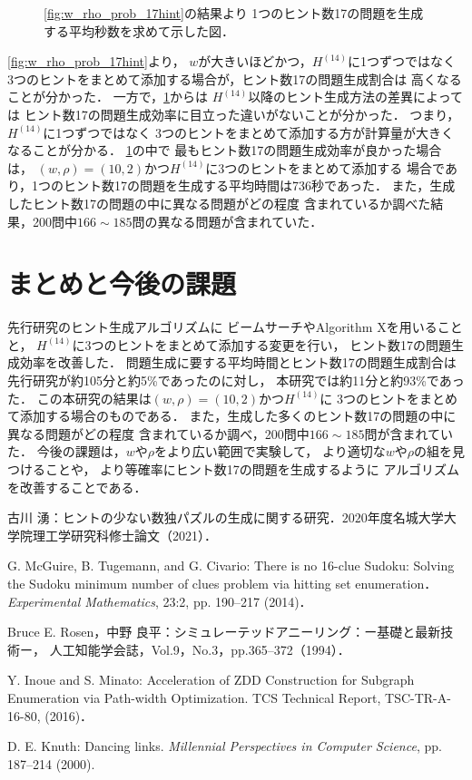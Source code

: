 \documentclass[a4paper, 9pt]{jarticle}
\begin{document}
\begin{論文概要}
\begin{figure}[bt]
  \caption{\figurename{\ref{fig:w_rho_prob_17hint}}の結果より
  1つのヒント数17の問題を生成する平均秒数を求めて示した図．} 
  \label{fig:w_rho_efficiency_17hint}
\end{figure}
\figurename{\ref{fig:w_rho_prob_17hint}}より，
$w$が大きいほどかつ，$H^{(14)}$に1つずつではなく
3つのヒントをまとめて添加する場合が，ヒント数17の問題生成割合は
高くなることが分かった．
一方で，\figurename{\ref{fig:w_rho_efficiency_17hint}}からは
$H^{(14)}$以降のヒント生成方法の差異によっては
ヒント数17の問題生成効率に目立った違いがないことが分かった．
つまり，$H^{(14)}$に1つずつではなく
3つのヒントをまとめて添加する方が計算量が大きくなることが分かる．
\figurename{\ref{fig:w_rho_efficiency_17hint}}の中で
最もヒント数17の問題生成効率が良かった場合は，
$(w, \rho) = (10, 2)$かつ$H^{(14)}$に3つのヒントをまとめて添加する
場合であり，1つのヒント数17の問題を生成する平均時間は736秒であった．
また，生成したヒント数17の問題の中に異なる問題がどの程度
含まれているか調べた結果，200問中$166 \sim 185$問の異なる問題が含まれていた．

\section{まとめと今後の課題}
先行研究のヒント生成アルゴリズムに
ビームサーチやAlgorithm Xを用いることと，
$H^{(14)}$に3つのヒントをまとめて添加する変更を行い，
ヒント数17の問題生成効率を改善した．
問題生成に要する平均時間とヒント数17の問題生成割合は
先行研究が約105分と約5\%であったのに対し，
本研究では約11分と約93\%であった．
この本研究の結果は$(w, \rho) = (10, 2)$かつ$H^{(14)}$に
3つのヒントをまとめて添加する場合のものである．
また，生成した多くのヒント数17の問題の中に異なる問題がどの程度
含まれているか調べ，200問中$166 \sim 185$問が含まれていた．
今後の課題は，$w$や$\rho$をより広い範囲で実験して，
より適切な$w$や$\rho$の組を見つけることや，
より等確率にヒント数17の問題を生成するように
アルゴリズムを改善することである．

\begin{thebibliography}{10}

  古川 湧：ヒントの少ない数独パズルの生成に関する研究．$2020$年度名城大学大学院理工学研究科修士論文（2021）．

  G. McGuire, B. Tugemann, and G. Civario:
  There is no 16-clue Sudoku: Solving the Sudoku minimum number of clues problem via hitting set enumeration．
  {\it Experimental Mathematics}, 23:2, pp. 190--217 (2014)．

  Bruce E. Rosen，中野 良平：シミュレーテッドアニーリング：ー基礎と最新技術ー，
  人工知能学会誌，Vol.9，No.3，pp.365--372（1994）．
  
  Y. Inoue and S. Minato: Acceleration of ZDD Construction for Subgraph 
  Enumeration via Path-width Optimization. TCS Technical Report, 
  TSC-TR-A-16-80, (2016)．

  D. E. Knuth: Dancing links. 
  {\it Millennial Perspectives in Computer Science}, pp. 187--214 (2000).
  
\end{thebibliography}

\end{論文概要} %
\end{document}

